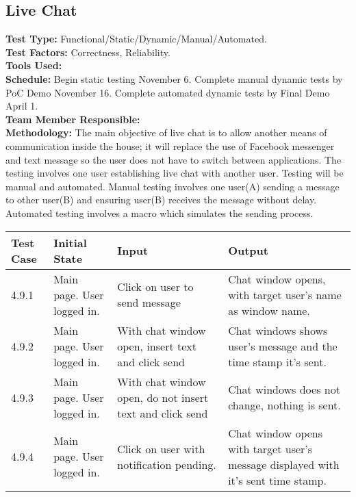 \documentclass[12pt]{article}
\begin{document}
\subsection{Live Chat}
\textbf{Test Type:} Functional/Static/Dynamic/Manual/Automated. \\
\textbf{Test Factors:} Correctness, Reliability. \\
\textbf{Tools Used:} \\
\textbf{Schedule:} Begin static testing November 6. Complete manual dynamic tests by PoC Demo November 16. Complete automated dynamic tests by Final Demo April 1. \\
\textbf{Team Member Responsible:} \\
\textbf{Methodology:} The main objective of live chat is to allow another means of communication inside the house; it will replace the use of Facebook messenger and text message so the user does not have to switch between applications. The testing involves one user establishing live chat with another user. Testing will be manual and automated. Manual testing involves one user(A) sending a message to other user(B) and ensuring user(B) receives the message without delay. Automated testing involves a macro which simulates the sending process.
\newline
\newline
\newline
\newline
\begin{longtable}{|p{2cm}|p{3cm}|p{5cm}|p{5cm}|}
    \hline
    \textbf{Test Case}  & \textbf{Initial State} & \textbf{Input} & \textbf{Output} \\ \hline
    4.9.1 & Main page. User logged in. & Click on user to send message & Chat window opens, with target user's name as window name. \\ 
    \hline
    4.9.2 & Main page. User logged in. & With chat window open, insert text and click send & Chat windows shows user's message and the time stamp it's sent. \\ 
    \hline
    4.9.3 & Main page. User logged in. & With chat window open, do not insert text and click send & Chat windows does not change, nothing is sent. \\ 
    \hline
    4.9.4 & Main page. User logged in. & Click on user with notification pending. & Chat window opens with target user's message displayed with it's sent time stamp. \\
    \hline
\end{longtable}
\end{document}
